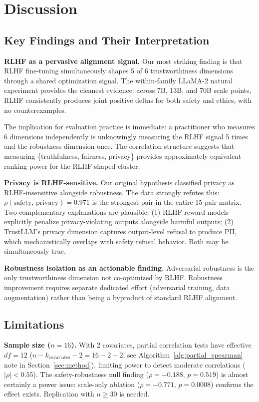 \section{Discussion}
\label{sec:discussion}

\subsection{Key Findings and Their Interpretation}

\textbf{RLHF as a pervasive alignment signal.} Our most striking finding is that RLHF fine-tuning simultaneously shapes 5 of 6 trustworthiness dimensions through a shared optimization signal. The within-family LLaMA-2 natural experiment provides the cleanest evidence: across 7B, 13B, and 70B scale points, RLHF consistently produces joint positive deltas for both safety and ethics, with no counterexamples.

The implication for evaluation practice is immediate: a practitioner who measures 6 dimensions independently is unknowingly measuring the RLHF signal 5 times and the robustness dimension once. The correlation structure suggests that measuring \{truthfulness, fairness, privacy\} provides approximately equivalent ranking power for the RLHF-shaped cluster.

\textbf{Privacy is RLHF-sensitive.} Our original hypothesis classified privacy as RLHF-insensitive alongside robustness. The data strongly refutes this: $\rho(\text{safety, privacy}) = 0.971$ is the strongest pair in the entire 15-pair matrix. Two complementary explanations are plausible: (1) RLHF reward models explicitly penalize privacy-violating outputs alongside harmful outputs; (2) TrustLLM's privacy dimension captures output-level refusal to produce PII, which mechanistically overlaps with safety refusal behavior. Both may be simultaneously true.

\textbf{Robustness isolation as an actionable finding.} Adversarial robustness is the only trustworthiness dimension not co-optimized by RLHF. Robustness improvement requires separate dedicated effort (adversarial training, data augmentation) rather than being a byproduct of standard RLHF alignment.

\subsection{Limitations}

\textbf{Sample size ($n=16$).} With 2 covariates, partial correlation tests have effective $df=12$ ($n - k_\text{covariates} - 2 = 16 - 2 - 2$; see Algorithm~\ref{alg:partial_spearman} note in Section~\ref{sec:method}), limiting power to detect moderate correlations ($|\rho| < 0.55$). The safety-robustness null finding ($\rho=-0.188$, $p=0.519$) is almost certainly a power issue: scale-only ablation ($\rho=-0.771$, $p=0.0008$) confirms the effect exists. Replication with $n \geq 30$ is needed.

